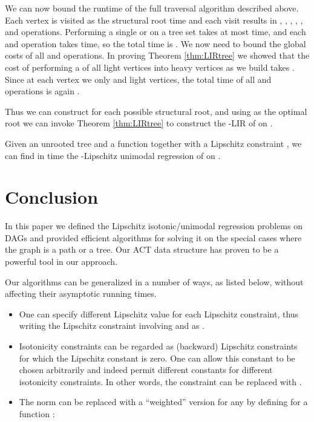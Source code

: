 \documentclass[11pt]{article}
\begin{document}
We can now bound the runtime of the full traversal algorithm described above.  Each vertex  is visited as the structural root  time and each visit results in  , , , , , and  operations.  
Performing a single  or  on a tree set takes at most  time, and each  and  operation takes  time, so the total time is .  
We now need to bound the global costs of all  and  operations.  In proving Theorem \ref{thm:LIRtree} we showed that the cost of performing a  of all light vertices into heavy vertices as we build  takes .  Since at each vertex  we only  and  light vertices, the total time of all  and  operations is again .  

Thus we can construct  for each possible structural root, and using  as the optimal root we can invoke Theorem \ref{thm:LIRtree} to construct the -LIR of  on .  

\begin{theorem}
Given an unrooted tree  and a function  together with a Lipschitz constraint , we can find in  time 
the -Lipschitz unimodal regression of  on .
\label{thm:LURtree}
\end{theorem}



\section{Conclusion}\label{sec:conclusion}
In this paper we defined the Lipschitz isotonic/unimodal regression 
problems on DAGs and provided efficient algorithms for solving it on the special cases where the graph is a path or a tree. 
Our ACT data structure has proven to be a powerful tool in our approach.




Our algorithms can be generalized in a number of ways, as
listed below, without affecting their asymptotic running times. 
\begin{itemize} 
\item One can specify different Lipschitz value  for each Lipschitz constraint, thus writing the Lipschitz constraint involving  and  as . 
\item Isotonicity constraints can be regarded as (backward) Lipschitz constraints for which the Lipschitz constant is zero. One can allow this constant to be chosen arbitrarily and indeed permit different constants for different isotonicity constraints. In other words, the constraint  can be replaced with .

\item The  norm  can be replaced with a ``weighted'' version  for any  by defining for a function :  

\end{itemize}
\end{document}
